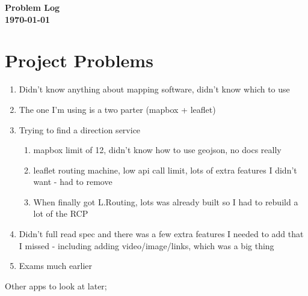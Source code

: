 \documentclass[a4paper,twoside,notitlepage,11pt]{article}
\begin{document}
\pagestyle{empty}
\begin{center}
 {\LARGE \textbf{Problem Log} \\ [0.2cm]}
	 \textbf{\today}
\end{center}

\section{Project Problems}
\begin{enumerate}
\item Didn't know anything about mapping software, didn't know which to use
\item The one I'm using is a two parter (mapbox + leaflet)
\item Trying to find a direction service
	\begin{enumerate}
	\item mapbox limit of 12, didn't know how to use geojson, no docs really
	\item leaflet routing machine, low api call limit, lots of extra features I didn't want - had to remove
	\item When finally got L.Routing, lots was already built so I had to rebuild a lot of the RCP
	\end{enumerate}
\item Didn't full read spec and there was a few extra features I needed to add that I missed - including adding video/image/links, which was a big thing
\item Exams much earlier
\end{enumerate}


{\color{red} 
Other apps to look at later;\ \\
\ \\
}
\end{document}
